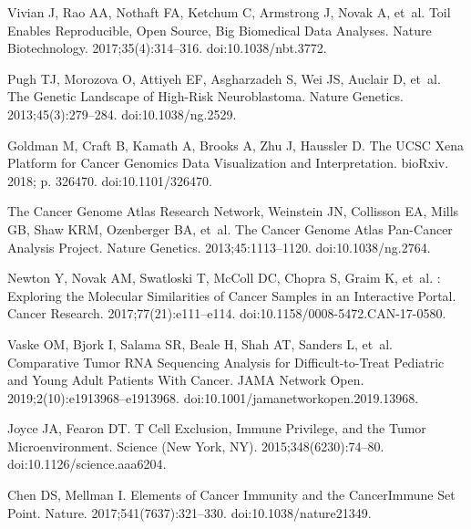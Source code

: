 \documentclass[10pt,letterpaper]{article}
\providecommand{\DIFdelbegin}{} %
\providecommand{\DIFdelend}{} %
\newcommand{\DIFscaledelfig}{0.5}
\newlength{\DIFdelgraphicswidth} %
\newlength{\DIFdelgraphicsheight} %
\newcommand{\DIFdelincludegraphics}[2][]{%
\sbox{\DIFdelgraphicsbox}{\DIFOincludegraphics[#1]{#2}}%
\settoboxwidth{\DIFdelgraphicswidth}{\DIFdelgraphicsbox} %
\settoboxtotalheight{\DIFdelgraphicsheight}{\DIFdelgraphicsbox} %
\scalebox{\DIFscaledelfig}{%
\parbox[b]{\DIFdelgraphicswidth}{\usebox{\DIFdelgraphicsbox}\\[-\baselineskip] \rule{\DIFdelgraphicswidth}{0em}}\llap{\resizebox{\DIFdelgraphicswidth}{\DIFdelgraphicsheight}{%
\setlength{\unitlength}{\DIFdelgraphicswidth}%
\begin{picture}(1,1)%
\thicklines\linethickness{2pt} %
{\color[rgb]{1,0,0}\put(0,0){\framebox(1,1){}}}%
{\color[rgb]{1,0,0}\put(0,0){\line( 1,1){1}}}%
{\color[rgb]{1,0,0}\put(0,1){\line(1,-1){1}}}%
\end{picture}%
}\hspace*{3pt}}} %
} %
\DeclareRobustCommand{\DIFdelbegin}{\DIFOdelbegin \let\includegraphics\DIFdelincludegraphics} %
\DeclareRobustCommand{\DIFdelend}{\DIFOaddend \let\includegraphics\DIFOincludegraphics} %
\begin{document}
\begin{thebibliography}{10}
	\DIFdelbegin %

\DIFdelend {}
	Vivian J, Rao AA, Nothaft FA, Ketchum C, Armstrong J, Novak A, et~al.
	\newblock Toil Enables Reproducible, Open Source, Big Biomedical Data Analyses.
	\newblock Nature Biotechnology. 2017;35(4):314--316.
	\newblock doi:{10.1038/nbt.3772}.

	Pugh TJ, Morozova O, Attiyeh EF, Asgharzadeh S, Wei JS, Auclair D, et~al.
	\newblock The Genetic Landscape of High-Risk Neuroblastoma.
	\newblock Nature Genetics. 2013;45(3):279--284.
	\newblock doi:{10.1038/ng.2529}.

	Goldman M, Craft B, Kamath A, Brooks A, Zhu J, Haussler D.
	\newblock The {{UCSC Xena Platform}} for Cancer Genomics Data Visualization and
	Interpretation.
	\newblock bioRxiv. 2018; p. 326470.
	\newblock doi:{10.1101/326470}.

	{The Cancer Genome Atlas Research Network}, Weinstein JN, Collisson EA, Mills
	GB, Shaw KRM, Ozenberger BA, et~al.
	\newblock The {{Cancer Genome Atlas Pan}}-{{Cancer}} Analysis Project.
	\newblock Nature Genetics. 2013;45:1113--1120.
	\newblock doi:{10.1038/ng.2764}.

	Newton Y, Novak AM, Swatloski T, McColl DC, Chopra S, Graim K, et~al.
	: {{Exploring}} the {{Molecular Similarities}} of
	{{Cancer Samples}} in an {{Interactive Portal}}.
	\newblock Cancer Research. 2017;77(21):e111--e114.
	\newblock doi:{10.1158/0008-5472.CAN-17-0580}.

	Vaske OM, Bjork I, Salama SR, Beale H, Shah AT, Sanders L, et~al.
	\newblock Comparative {{Tumor RNA Sequencing Analysis}} for
	{{Difficult}}-to-{{Treat Pediatric}} and {{Young Adult Patients With
			Cancer}}.
	\newblock JAMA Network Open. 2019;2(10):e1913968--e1913968.
	\newblock doi:{10.1001/jamanetworkopen.2019.13968}.

	Joyce JA, Fearon DT.
	\newblock T Cell Exclusion, Immune Privilege, and the Tumor Microenvironment.
	\newblock Science (New York, NY). 2015;348(6230):74--80.
	\newblock doi:{10.1126/science.aaa6204}.

	Chen DS, Mellman I.
	\newblock Elements of Cancer Immunity and the Cancer\textendash{}Immune Set
	Point.
	\newblock Nature. 2017;541(7637):321--330.
	\newblock doi:{10.1038/nature21349}.


\end{thebibliography}
\end{document}
